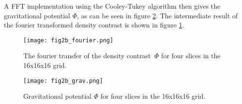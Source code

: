 A FFT implementation using the Cooley-Tukey algorithm then gives the gravitational potential $\Phi$, as can be seen in figure \ref{fig:gravitational_potential}.
The intermediate result of the fourier transformed density contrast is shown in figure \ref{fig:fourier_potential}.

\begin{figure}
    \centering
    \texttt{[image: fig2b\_fourier.png]}
    \caption{The fourier transfer of the density contrast $~\Phi$ for four slices in the 16x16x16 grid.}
    \label{fig:fourier_potential}
\end{figure}

\begin{figure}
    \centering
    \texttt{[image: fig2b\_grav.png]}
    \caption{Gravitational potential $\Phi$ for four slices in the 16x16x16 grid.}
    \label{fig:gravitational_potential}
\end{figure}






